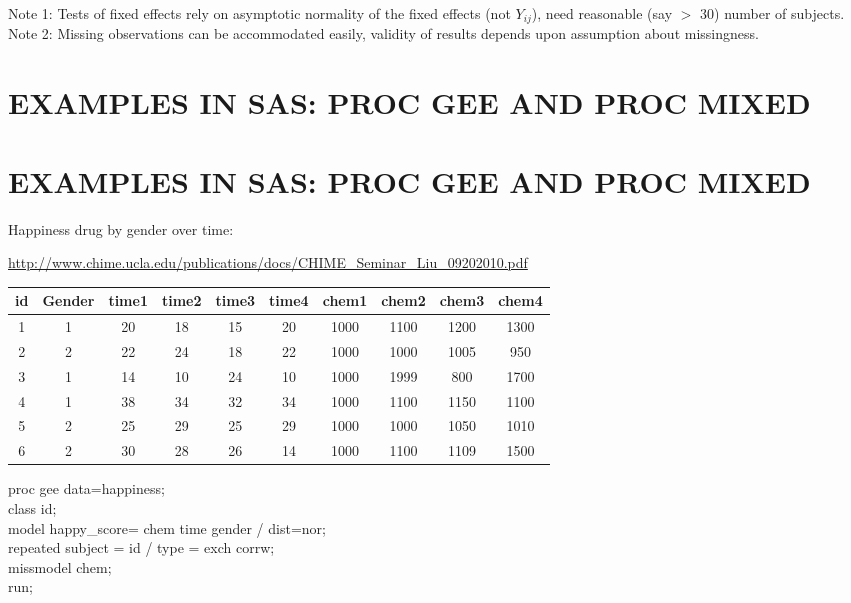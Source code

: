 \documentclass[letterpaper,11pt]{article}
\begin{document}
Note 1: Tests of fixed effects rely on asymptotic normality of the fixed effects (not $Y_{ij}$), need reasonable (say $>$ 30) number of subjects.\\

Note 2: Missing observations can be accommodated easily, validity of results depends upon assumption about missingness.

\newpage
\noindent 

\section*{EXAMPLES IN SAS: PROC GEE AND PROC MIXED}

\section{EXAMPLES IN SAS: PROC GEE AND PROC MIXED}

Happiness drug by gender over time:

\url{http://www.chime.ucla.edu/publications/docs/CHIME_Seminar_Liu_09202010.pdf} \\

\begin{center}
 \begin{tabular}{||c c c c c c c c c c||} 
 \hline
 id & Gender & time1 & time2 & time3 & time4 & chem1 & chem2 & chem3 & chem4\\ [0.5ex] 
 \hline\hline
1 & 1 & 20 & 18 & 15 & 20 & 1000 & 1100 & 1200 & 1300 \\ [0.5ex] 
2 & 2 & 22 & 24 & 18 & 22 & 1000 & 1000 & 1005 & 950 \\
3 & 1 & 14 & 10 & 24 & 10 & 1000 & 1999 & 800  & 1700 \\
4 & 1 & 38 & 34 & 32 & 34 & 1000 & 1100 & 1150 & 1100 \\
5 & 2 & 25 & 29 & 25 & 29 & 1000 & 1000 & 1050 & 1010 \\
6 & 2 & 30 & 28 & 26 & 14 & 1000 & 1100 & 1109 & 1500 \\ [1ex] 
 \hline
\end{tabular}
\end{center}

proc gee data=happiness;\\
class id;\\
model happy\_score= chem time gender / dist=nor;\\
repeated subject = id / type = exch corrw;\\
missmodel chem; \\
run;\\
\\
\end{document}
